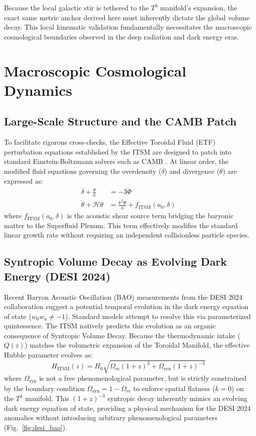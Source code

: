 \documentclass[aps,prd,10pt,twocolumn,superscriptaddress,nofootinbib]{revtex4-2}
\begin{document}
Because the local galactic stir is tethered to the $T^3$ manifold's expansion, the exact same metric anchor derived here must inherently dictate the global volume decay. This local kinematic validation fundamentally necessitates the macroscopic cosmological boundaries observed in the deep radiation and dark energy eras.

\section{Macroscopic Cosmological Dynamics}

\subsection{Large-Scale Structure and the CAMB Patch}
To facilitate rigorous cross-checks, the Effective Toroidal Fluid (ETF) perturbation equations established by the ITSM are designed to patch into standard Einstein-Boltzmann solvers such as CAMB \cite{camb}. At linear order, the modified fluid equations governing the overdensity ($\delta$) and divergence ($\theta$) are expressed as:
\begin{align}
\dot{\delta} + \frac{\theta}{a} &= -3\dot{\Phi} \\
\dot{\theta} + \mathcal{H}\theta &= \frac{k^2\Psi}{a} + f_{\text{ITSM}}(a_0, \delta)
\end{align}
where $f_{\text{ITSM}}(a_0, \delta)$ is the acoustic shear source term bridging the baryonic matter to the Superfluid Plenum. This term effectively modifies the standard linear growth rate without requiring an independent collisionless particle species.

\subsection{\label{sec:bao}Syntropic Volume Decay as Evolving Dark Energy (DESI 2024)}
Recent Baryon Acoustic Oscillation (BAO) measurements from the DESI 2024 collaboration \cite{desi} suggest a potential temporal evolution in the dark energy equation of state ($w_0w_a \neq -1$). Standard models attempt to resolve this via parameterized quintessence. The ITSM natively predicts this evolution as an organic consequence of Syntropic Volume Decay. Because the thermodynamic intake ($Q(z)$) matches the volumetric expansion of the Toroidal Manifold, the effective Hubble parameter evolves as:
\begin{equation}
H_{\text{ITSM}}(z) = H_0 \sqrt{\Omega_m(1+z)^3 + \Omega_{\text{syn}}(1+z)^{-3}}
\end{equation}
where $\Omega_{\text{syn}}$ is not a free phenomenological parameter, but is strictly constrained by the boundary condition $\Omega_{\text{syn}} = 1 - \Omega_m$ to enforce spatial flatness ($k=0$) on the $T^3$ manifold. This $(1+z)^{-3}$ syntropic decay inherently mimics an evolving dark energy equation of state, providing a physical mechanism for the DESI 2024 anomalies without introducing arbitrary phenomenological parameters (Fig.~\ref{fig:desi_bao}).
\end{document}
